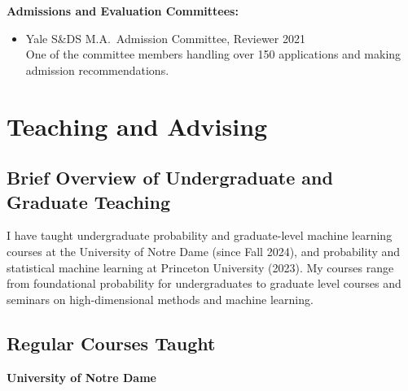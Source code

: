 \documentclass[letterpaper,oneside]{article}
\begin{document}
\noindent\textbf{Admissions and Evaluation Committees:}
\begin{itemize}[leftmargin=0pt, label={}]
  \item Yale S\&DS M.A.\ Admission Committee, Reviewer \hfill 2021\\
  One of the committee members handling over 150 applications and making admission recommendations.
\end{itemize}

%

\section*{Teaching and Advising}

\subsection*{Brief Overview of Undergraduate and Graduate Teaching}

\noindent I have taught undergraduate probability and graduate-level machine learning courses at the University of Notre Dame (since Fall 2024), and probability and statistical machine learning at Princeton University (2023). My courses range from foundational probability for undergraduates to graduate level courses and seminars on high-dimensional methods and machine learning.

\subsection*{Regular Courses Taught}

\noindent\textbf{University of Notre Dame}
\end{document}
